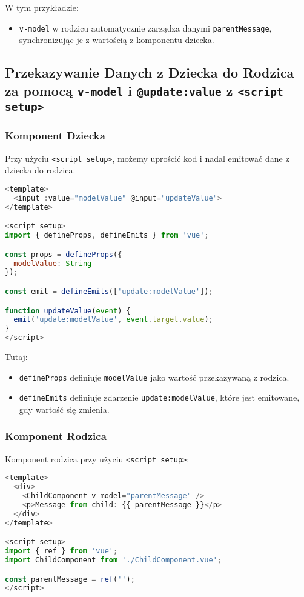 \documentclass[a4paper,12pt]{article}
\begin{document}
W tym przykładzie:
\begin{itemize}
  \item \texttt{v-model} w rodzicu automatycznie zarządza danymi \texttt{parentMessage}, synchronizując je z wartością z komponentu dziecka.
\end{itemize}

\subsection{Przekazywanie Danych z Dziecka do Rodzica za pomocą \texttt{v-model} i \texttt{@update:value} z \texttt{<script setup>}}

\subsubsection{Komponent Dziecka}
Przy użyciu \texttt{<script setup>}, możemy uprościć kod i nadal emitować dane z dziecka do rodzica.

\begin{lstlisting}[language=JavaScript]
<template>
  <input :value="modelValue" @input="updateValue">
</template>

<script setup>
import { defineProps, defineEmits } from 'vue';

const props = defineProps({
  modelValue: String
});

const emit = defineEmits(['update:modelValue']);

function updateValue(event) {
  emit('update:modelValue', event.target.value);
}
</script>
\end{lstlisting}

Tutaj:
\begin{itemize}
  \item \texttt{defineProps} definiuje \texttt{modelValue} jako wartość przekazywaną z rodzica.
  \item \texttt{defineEmits} definiuje zdarzenie \texttt{update:modelValue}, które jest emitowane, gdy wartość się zmienia.
\end{itemize}

\subsubsection{Komponent Rodzica}
Komponent rodzica przy użyciu \texttt{<script setup>}:

\begin{lstlisting}[language=JavaScript]
<template>
  <div>
    <ChildComponent v-model="parentMessage" />
    <p>Message from child: {{ parentMessage }}</p>
  </div>
</template>

<script setup>
import { ref } from 'vue';
import ChildComponent from './ChildComponent.vue';

const parentMessage = ref('');
</script>
\end{lstlisting}
\end{document}
